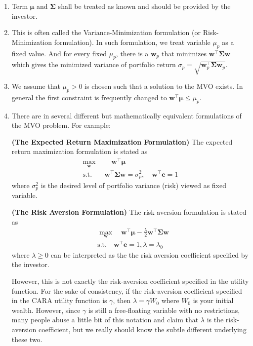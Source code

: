\documentclass[13pt]{article}
\theoremstyle{definition}
\theoremstyle{remark}
\newenvironment{remark}
  {\pushQED{\qed}\renewcommand{\qedsymbol}{$\triangle$}\remarkx}
  {\popQED\endremarkx}
\begin{document}
\begin{remark}\hfill
\begin{enumerate}
\item Term $\bm{\mu}$ and $\mathbf{\Sigma}$ shall be treated as known and should be provided by the investor.
    \item This is often called the Variance-Minimization formulation (or Risk-Minimization formulation). In such formulation, we treat variable $\mu_p$ as a fixed value. And for every fixed $\mu_p$, there is a $\bm{w}_p$ that minimizes $\bm{w}^\top\mathbf{\Sigma}\bm{w}$ which gives the minimized variance of portfolio return $\sigma_p=\sqrt{\bm{w}_p^\top\mathbf{\Sigma}\bm{w}_p}$.
    \item We assume that $\mu_{p}>0$ is chosen such that a solution to the MVO exists. In general the first constraint is frequently changed to $\bm{w}^{\top} \bm{\mu} \leq \mu_{p}$.\label{re:general MVO}
    \item There are in several different but mathematically equivalent formulations of the MVO problem. For example:

    \textbf{(The Expected Return Maximization Formulation)} The expected return maximization formulation is stated as
\begin{align*}
\max _{\bm{w}} & \quad \bm{w}^{\top} \bm{\mu} \\
\text {s.t.} \quad & \bm{w}^{\top} \mathbf{\Sigma} \bm{w}=\sigma_{p}^{2}, \quad  \bm{w}^{\top} \bm{e}=1
\end{align*}
where $\sigma_{p}^{2}$ is the desired level of portfolio variance (risk) viewed as fixed variable.

    \textbf{(The Risk Aversion Formulation)} The risk aversion formulation is stated as
\begin{align*}
&\max _{\bm{w}}\quad  \bm{w}^{\top} \bm{\mu}-\frac{\lambda}{2} \bm{w}^{\top} \mathbf{\Sigma} \bm{w} \\
& \text {s.t.} \quad \bm{w}^{\top} \bm{e}=1, \lambda = \lambda_0
\end{align*}
where $\lambda \geq 0$ can be interpreted as the the risk aversion coefficient specified by the investor. 

However, this is not exactly the risk-aversion coefficient specified in the utility function. For the sake of consistency, if the risk-aversion coefficient specified in the CARA utility function is $\gamma$, then $\lambda=\gamma W_0$ where $W_0$ is your initial wealth. However, since $\gamma$ is still a free-floating variable with no restrictions, many people abuse a little bit of this notation and claim that $\lambda$ is the risk-aversion coefficient, but we really should know the subtle different underlying these two.

\end{enumerate}
\end{remark}
\end{document}
